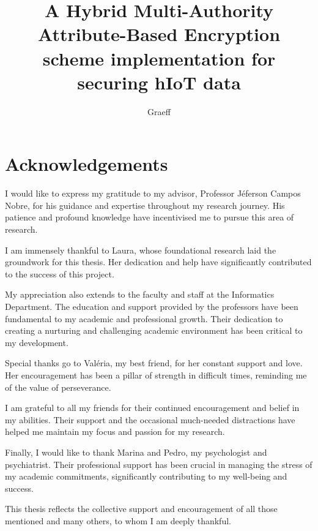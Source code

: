 \documentclass[cic,tc,english]{iiufrgs}
\title{
    A Hybrid Multi-Authority Attribute-Based Encryption scheme implementation for securing hIoT data
}
\author{Graeff}{Felipe de Almeida}
\begin{document}
\maketitle



\chapter*{Acknowledgements}
    I would like to express my gratitude to my advisor, Professor Jéferson Campos Nobre, for his guidance and expertise throughout my research journey. His patience and profound knowledge have incentivised me to pursue this area of research.

    I am immensely thankful to Laura, whose foundational research laid the groundwork for this thesis. Her dedication and help have significantly contributed to the success of this project.

    My appreciation also extends to the faculty and staff at the Informatics Department. The education and support provided by the professors have been fundamental to my academic and professional growth. Their dedication to creating a nurturing and challenging academic environment has been critical to my development.

    Special thanks go to Valéria, my best friend, for her constant support and love. Her encouragement has been a pillar of strength in difficult times, reminding me of the value of perseverance.

    I am grateful to all my friends for their continued encouragement and belief in my abilities. Their support and the occasional much-needed distractions have helped me maintain my focus and passion for my research.

    Finally, I would like to thank Marina and Pedro, my psychologist and psychiatrist. Their professional support has been crucial in managing the stress of my academic commitments, significantly contributing to my well-being and success.

    This thesis reflects the collective support and encouragement of all those mentioned and many others, to whom I am deeply thankful.



\begin{abstract}
    \lipsum[1]
\end{abstract}

\begin{translatedabstract}
    \lipsum[1]
\end{translatedabstract}
\end{document}
